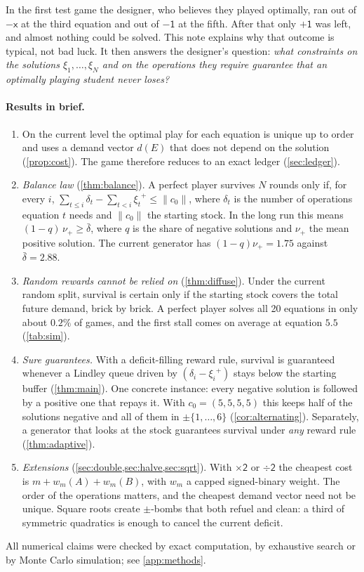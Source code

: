 \documentclass[11pt,a4paper]{article}
\theoremstyle{definition}
\theoremstyle{remark}
\newcommand{\mX}{\ensuremath{\mathord{-}\mathsf{x}}}
\newcommand{\pU}{\ensuremath{\mathord{+}\mathsf{1}}}
\newcommand{\mU}{\ensuremath{\mathord{-}\mathsf{1}}}
\newcommand{\dbl}{\ensuremath{\mathord{\times}\mathsf{2}}}
\newcommand{\hlv}{\ensuremath{\mathord{\div}\mathsf{2}}}
\newcommand{\norm}[1]{\lVert #1\rVert}
\newcommand{\pos}[1]{{#1}^{+}}
\begin{document}
In the first test game the designer, who believes they played optimally, ran out of
$\mX$ at the third equation and out of $\mU$ at the fifth. After that only $\pU$ was
left, and almost nothing could be solved. This note explains why that outcome is
typical, not bad luck. It then answers the designer's question: \emph{what constraints
on the solutions $\xi_1,\dots,\xi_N$ and on the operations they require guarantee that
an optimally playing student never loses?}

\paragraph{Results in brief.}
\begin{enumerate}[label=(\roman*),nosep]
\item On the current level the optimal play for each equation is unique up to order
  and uses a demand vector $d(E)$ that does not depend on the solution
  (\cref{prop:cost}). The game therefore reduces to an exact ledger
  (\cref{sec:ledger}).
\item \emph{Balance law} (\cref{thm:balance}). A perfect player survives $N$ rounds
  only if, for every $i$,
  $\sum_{t\le i}\delta_t-\sum_{t<i}\pos{\xi_t}\le\norm{c_0}$, where $\delta_t$ is the
  number of operations equation $t$ needs and $\norm{c_0}$ the starting stock. In the
  long run this means $(1-q)\,\nu_+\ge\bar\delta$, where $q$ is the share of negative
  solutions and $\nu_+$ the mean positive solution. The current generator has
  $(1-q)\nu_+=1.75$ against $\bar\delta=2.88$.
\item \emph{Random rewards cannot be relied on} (\cref{thm:diffuse}). Under the current
  random split, survival is certain only if the starting stock covers the total future
  demand, brick by brick. A perfect player solves all 20 equations in only about $0.2\%$
  of games, and the first stall comes on average at equation $5.5$
  (\cref{tab:sim}).
\item \emph{Sure guarantees.} With a deficit-filling reward rule,
  survival is guaranteed whenever a Lindley queue driven by $(\delta_i-\pos{\xi_i})$
  stays below the starting buffer (\cref{thm:main}). One concrete instance: every
  negative solution is followed by a positive one that repays it. With $c_0=(5,5,5,5)$
  this keeps half of the solutions negative and all of them in $\pm\{1,\dots,6\}$
  (\cref{cor:alternating}). Separately, a generator that looks at the stock guarantees
  survival under \emph{any} reward rule (\cref{thm:adaptive}).
\item \emph{Extensions} (\cref{sec:double,sec:halve,sec:sqrt}). With $\dbl$ or $\hlv$ the
  cheapest cost is $m+w_m(A)+w_m(B)$, with $w_m$ a capped signed-binary weight. The order
  of the operations matters, and the cheapest demand vector need not be unique.
  Square roots create $\pm$-bombs that both refuel and clean: a third of symmetric
  quadratics is enough to cancel the current deficit.
\end{enumerate}
All numerical claims were checked by exact computation, by exhaustive search or by
Monte Carlo simulation; see \cref{app:methods}.
\end{document}
